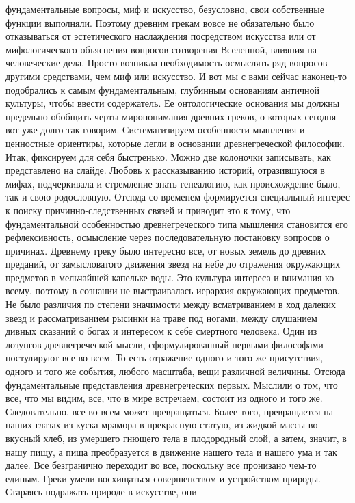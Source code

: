фундаментальные вопросы, миф и искусство, безусловно, свои собственные функции
выполняли. Поэтому древним грекам вовсе не обязательно было отказываться от
эстетического наслаждения посредством искусства или от мифологического
объяснения вопросов сотворения Вселенной, влияния на человеческие дела. Просто
возникла необходимость осмыслять ряд вопросов другими средствами, чем миф или
искусство. И вот мы с вами сейчас наконец-то подобрались к самым
фундаментальным, глубинным основаниям античной культуры, чтобы ввести
содержатель. Ее онтологические основания мы должны предельно обобщить черты
миропонимания древних греков, о которых сегодня вот уже долго так говорим.
Систематизируем особенности мышления и ценностные ориентиры, которые легли в
основании древнегреческой философии. Итак, фиксируем для себя быстренько. Можно
две колоночки записывать, как представлено на слайде. Любовь к рассказыванию
историй, отразившуюся в мифах, подчеркивала и стремление знать генеалогию, как
происхождение было, так и свою родословную. Отсюда со временем формируется
специальный интерес к поиску причинно-следственных связей и приводит это к тому,
что фундаментальной особенностью древнегреческого типа мышления становится его
рефлексивность, осмысление через последовательную постановку вопросов о
причинах. Древнему греку было интересно все, от новых земель до древних
преданий, от замысловатого движения звезд на небе до отражения окружающих
предметов в мельчайшей капельке воды. Это культура интереса и внимания ко всему,
поэтому в сознании не выстраивалась иерархия окружающих предметов. Не было
различия по степени значимости между всматриванием в ход далеких звезд и
рассматриванием рысинки на траве под ногами, между слушанием дивных сказаний о
богах и интересом к себе смертного человека. Один из лозунгов древнегреческой
мысли, сформулированный первыми философами постулируют все во всем. То есть
отражение одного и того же присутствия, одного и того же события, любого
масштаба, вещи различной величины. Отсюда фундаментальные представления
древнегреческих первых. Мыслили о том, что все, что мы видим, все, что в мире
встречаем, состоит из одного и того же. Следовательно, все во всем может
превращаться. Более того, превращается на наших глазах из куска мрамора в
прекрасную статую, из жидкой массы во вкусный хлеб, из умершего гнющего тела в
плодородный слой, а затем, значит, в нашу пищу, а пища преобразуется в движение
нашего тела и нашего ума и так далее. Все безгранично переходит во все,
поскольку все пронизано чем-то единым. Греки умели восхищаться совершенством и
устройством природы. Стараясь подражать природе в искусстве, они

